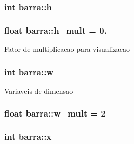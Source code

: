 \subsubsection[{\texorpdfstring{h}{h}}]{\setlength{\rightskip}{0pt plus 5cm}int barra\+::h\hspace{0.3cm}{\ttfamily [private]}}\hypertarget{classbarra_add2a64a98c1781d1cc9b7b1f744df1a5}{}\label{classbarra_add2a64a98c1781d1cc9b7b1f744df1a5}
\subsubsection[{\texorpdfstring{h\+\_\+mult}{h_mult}}]{\setlength{\rightskip}{0pt plus 5cm}float barra\+::h\+\_\+mult = 0.\hspace{0.3cm}{\ttfamily [private]}}\hypertarget{classbarra_a6ee439263b66198984d59f0ef128e7a6}{}\label{classbarra_a6ee439263b66198984d59f0ef128e7a6}
Fator de multiplicacao para visualizacao 
\subsubsection[{\texorpdfstring{w}{w}}]{\setlength{\rightskip}{0pt plus 5cm}int barra\+::w\hspace{0.3cm}{\ttfamily [private]}}\hypertarget{classbarra_a31fd53ae11742f912eb9e0b20707cb82}{}\label{classbarra_a31fd53ae11742f912eb9e0b20707cb82}
Variaveis de dimensao 
\subsubsection[{\texorpdfstring{w\+\_\+mult}{w_mult}}]{\setlength{\rightskip}{0pt plus 5cm}float barra\+::w\+\_\+mult = 2\hspace{0.3cm}{\ttfamily [private]}}\hypertarget{classbarra_a7ca620e27ef6e75eb8dfcc05a738a97c}{}\label{classbarra_a7ca620e27ef6e75eb8dfcc05a738a97c}
\subsubsection[{\texorpdfstring{x}{x}}]{\setlength{\rightskip}{0pt plus 5cm}int barra\+::x\hspace{0.3cm}{\ttfamily [private]}}\hypertarget{classbarra_a60f0c711fd29434f3fb07a3f584a83a1}{}\label{classbarra_a60f0c711fd29434f3fb07a3f584a83a1}
